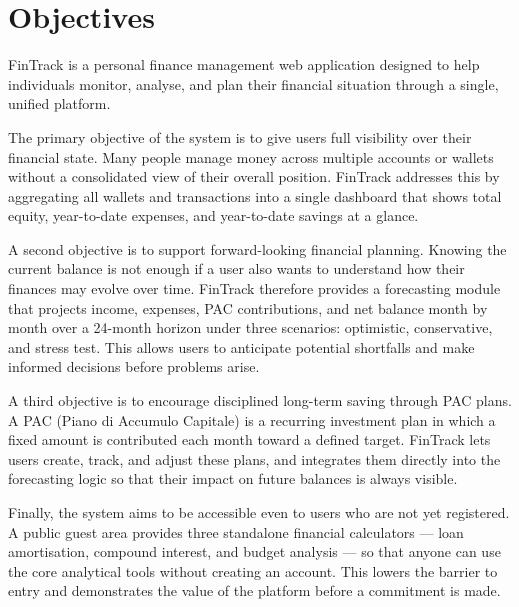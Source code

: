 \section{Objectives}


FinTrack is a personal finance management web application designed to help individuals monitor, analyse, and plan their financial situation through a single, unified platform.

The primary objective of the system is to give users full visibility over their financial state. Many people manage money across multiple accounts or wallets without a consolidated view of their overall position. FinTrack addresses this by aggregating all wallets and transactions into a single dashboard that shows total equity, year-to-date expenses, and year-to-date savings at a glance.

A second objective is to support forward-looking financial planning. Knowing the current balance is not enough if a user also wants to understand how their finances may evolve over time. FinTrack therefore provides a forecasting module that projects income, expenses, PAC contributions, and net balance month by month over a 24-month horizon under three scenarios: optimistic, conservative, and stress test. This allows users to anticipate potential shortfalls and make informed decisions before problems arise.

A third objective is to encourage disciplined long-term saving through PAC plans. A PAC (Piano di Accumulo Capitale) is a recurring investment plan in which a fixed amount is contributed each month toward a defined target. FinTrack lets users create, track, and adjust these plans, and integrates them directly into the forecasting logic so that their impact on future balances is always visible.

Finally, the system aims to be accessible even to users who are not yet registered. A public guest area provides three standalone financial calculators — loan amortisation, compound interest, and budget analysis — so that anyone can use the core analytical tools without creating an account. This lowers the barrier to entry and demonstrates the value of the platform before a commitment is made.